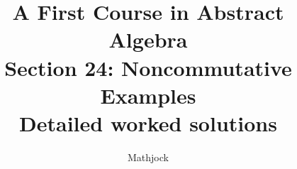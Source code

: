 
\title{\textbf{A First Course in Abstract Algebra}\\[0.3em]Section 24: Noncommutative Examples\\[0.3em]\large Detailed worked solutions}
\author{Mathjock}
\date{}

\maketitle
\bookinfo
\tableofcontents
\clearpage
\renewcommand{\thesection}{24}
\renewcommand{\theHsection}{fraleigh.24}


